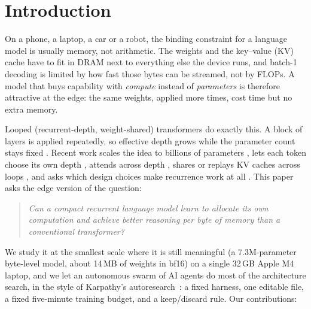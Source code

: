 \section{Introduction}

On a phone, a laptop, a car or a robot, the binding constraint for a language model is usually memory,
not arithmetic. The weights and the key--value (KV) cache have to fit in DRAM next to everything else
the device runs, and batch-1 decoding is limited by how fast those bytes can be streamed, not by FLOPs.
A model that buys capability with \emph{compute} instead of \emph{parameters} is therefore attractive at
the edge: the same weights, applied more times, cost time but no extra memory.

Looped (recurrent-depth, weight-shared) transformers do exactly this. A block of layers is applied
repeatedly, so effective depth grows while the parameter count stays fixed
\citep{dehghani2019universal,lan2020albert,giannou2023looped,saunshi2025reasoning}. Recent work scales
the idea to billions of parameters \citep{geiping2025scaling,zhu2025ouro}, lets each token choose its
own depth \citep{bae2025mixture,graves2016adaptive,banino2021pondernet}, attends across depth
\citep{yao2026arloop}, shares or replays KV caches across loops
\citep{huang2026looped,licakova2026kvreplay}, and asks which design choices make recurrence work at all
\citep{zhuang2026recurrence}. This paper asks the edge version of the question:

\begin{quote}
\emph{Can a compact recurrent language model learn to allocate its own computation and achieve better
reasoning per byte of memory than a conventional transformer?}
\end{quote}

We study it at the smallest scale where it is still meaningful (a 7.3M-parameter byte-level model,
about 14\,MB of weights in bf16) on a single 32\,GB Apple M4 laptop, and we let an autonomous swarm of
AI agents do most of the architecture search, in the style of Karpathy's
autoresearch~\citep{karpathy2026autoresearch}: a fixed harness, one editable file, a fixed five-minute
training budget, and a keep/discard rule. Our contributions:

